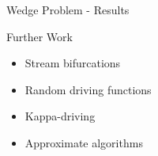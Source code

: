 \documentclass{beamer}
\begin{document}
\begin{frame}{Wedge Problem - Results}
\begin{adjustbox}{max totalsize={\textwidth}{\textheight}}

\end{adjustbox}
\end{frame}

\begin{frame}{Further Work}
    \begin{itemize}
        \item Stream bifurcations
        \item Random driving functions
        \item Kappa-driving
        \item Approximate algorithms
    \end{itemize}
\end{frame}
\end{document}
